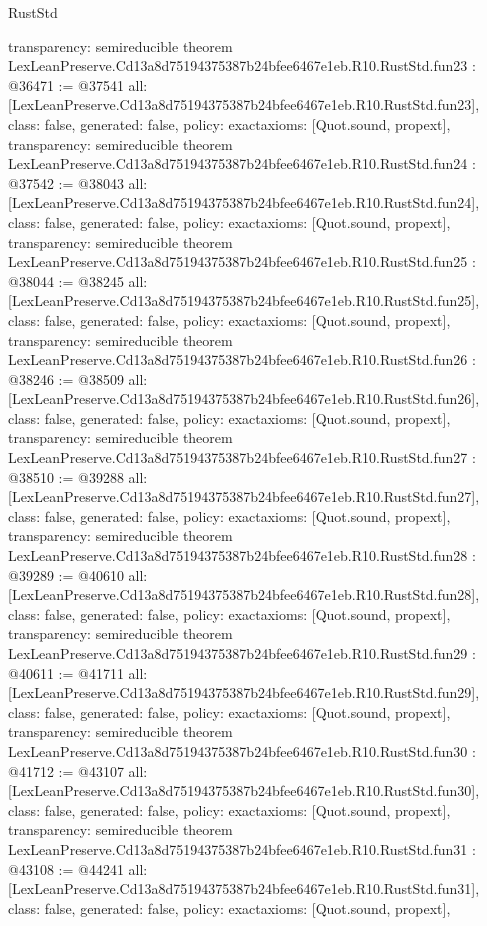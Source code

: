 \begin{lexlean}{RustStd}
\begin{coremodule}
{  transparency: semireducible
}
theorem LexLeanPreserve.Cd13a8d75194375387b24bfee6467e1eb.R10.RustStd.fun23 : @36471 := @37541 {
  all: [LexLeanPreserve.Cd13a8d75194375387b24bfee6467e1eb.R10.RustStd.fun23],
  class: false,
  generated: false,
  policy: exact{axioms: [Quot.sound, propext]},
  transparency: semireducible
}
theorem LexLeanPreserve.Cd13a8d75194375387b24bfee6467e1eb.R10.RustStd.fun24 : @37542 := @38043 {
  all: [LexLeanPreserve.Cd13a8d75194375387b24bfee6467e1eb.R10.RustStd.fun24],
  class: false,
  generated: false,
  policy: exact{axioms: [Quot.sound, propext]},
  transparency: semireducible
}
theorem LexLeanPreserve.Cd13a8d75194375387b24bfee6467e1eb.R10.RustStd.fun25 : @38044 := @38245 {
  all: [LexLeanPreserve.Cd13a8d75194375387b24bfee6467e1eb.R10.RustStd.fun25],
  class: false,
  generated: false,
  policy: exact{axioms: [Quot.sound, propext]},
  transparency: semireducible
}
theorem LexLeanPreserve.Cd13a8d75194375387b24bfee6467e1eb.R10.RustStd.fun26 : @38246 := @38509 {
  all: [LexLeanPreserve.Cd13a8d75194375387b24bfee6467e1eb.R10.RustStd.fun26],
  class: false,
  generated: false,
  policy: exact{axioms: [Quot.sound, propext]},
  transparency: semireducible
}
theorem LexLeanPreserve.Cd13a8d75194375387b24bfee6467e1eb.R10.RustStd.fun27 : @38510 := @39288 {
  all: [LexLeanPreserve.Cd13a8d75194375387b24bfee6467e1eb.R10.RustStd.fun27],
  class: false,
  generated: false,
  policy: exact{axioms: [Quot.sound, propext]},
  transparency: semireducible
}
theorem LexLeanPreserve.Cd13a8d75194375387b24bfee6467e1eb.R10.RustStd.fun28 : @39289 := @40610 {
  all: [LexLeanPreserve.Cd13a8d75194375387b24bfee6467e1eb.R10.RustStd.fun28],
  class: false,
  generated: false,
  policy: exact{axioms: [Quot.sound, propext]},
  transparency: semireducible
}
theorem LexLeanPreserve.Cd13a8d75194375387b24bfee6467e1eb.R10.RustStd.fun29 : @40611 := @41711 {
  all: [LexLeanPreserve.Cd13a8d75194375387b24bfee6467e1eb.R10.RustStd.fun29],
  class: false,
  generated: false,
  policy: exact{axioms: [Quot.sound, propext]},
  transparency: semireducible
}
theorem LexLeanPreserve.Cd13a8d75194375387b24bfee6467e1eb.R10.RustStd.fun30 : @41712 := @43107 {
  all: [LexLeanPreserve.Cd13a8d75194375387b24bfee6467e1eb.R10.RustStd.fun30],
  class: false,
  generated: false,
  policy: exact{axioms: [Quot.sound, propext]},
  transparency: semireducible
}
theorem LexLeanPreserve.Cd13a8d75194375387b24bfee6467e1eb.R10.RustStd.fun31 : @43108 := @44241 {
  all: [LexLeanPreserve.Cd13a8d75194375387b24bfee6467e1eb.R10.RustStd.fun31],
  class: false,
  generated: false,
  policy: exact{axioms: [Quot.sound, propext]},
}
\end{coremodule}
\end{lexlean}
